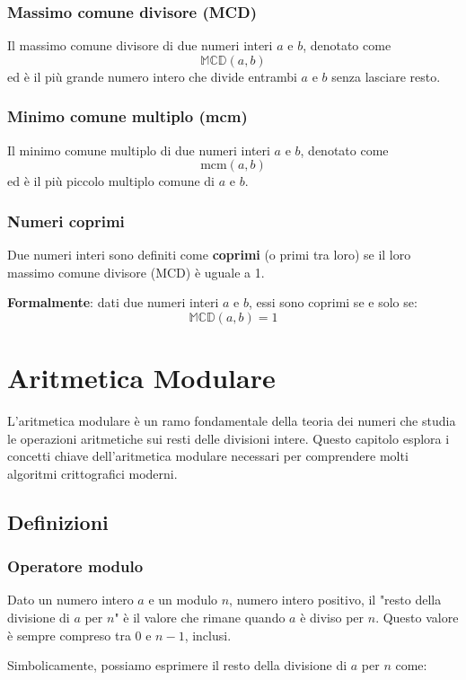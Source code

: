 \documentclass[a4paper,12pt]{report}
\begin{document}
\subsection*{Massimo comune divisore (MCD)}
Il massimo comune divisore di due numeri interi \( a \) e \( b \), denotato come 
\[ \mathbb{MCD}(a, b) \] 
ed è il più grande numero intero che divide entrambi \( a \) e \( b \) senza lasciare resto.

\subsection*{Minimo comune multiplo (mcm)}
Il minimo comune multiplo di due numeri interi \( a \) e \( b \), denotato come 
\[ \mathrm{mcm}(a, b) \]
ed è il più piccolo multiplo comune di \( a \) e \( b \).

\subsection*{Numeri coprimi}
Due numeri interi sono definiti come \textbf{coprimi} (o primi tra loro) se il loro massimo comune divisore (MCD) è uguale a 1. 

\textbf{Formalmente}: dati due numeri interi \(a\) e \(b\), essi sono coprimi se e solo se:
\[\mathbb{MCD}(a, b) = 1\]

\chapter{Aritmetica Modulare}

L'aritmetica modulare è un ramo fondamentale della teoria dei numeri che studia le operazioni aritmetiche sui resti delle divisioni intere. Questo capitolo esplora i concetti chiave dell'aritmetica modulare necessari per comprendere molti algoritmi crittografici moderni.

\section{Definizioni} 
\subsection*{Operatore modulo} Dato un numero intero $a$ e un modulo $n$, numero intero positivo, il "resto della divisione di $a$ per $n$" è il valore che rimane quando $a$ è diviso per $n$. Questo valore è sempre compreso tra 0 e $n-1$, inclusi.

Simbolicamente, possiamo esprimere il resto della divisione di $a$ per $n$ come:
\end{document}
